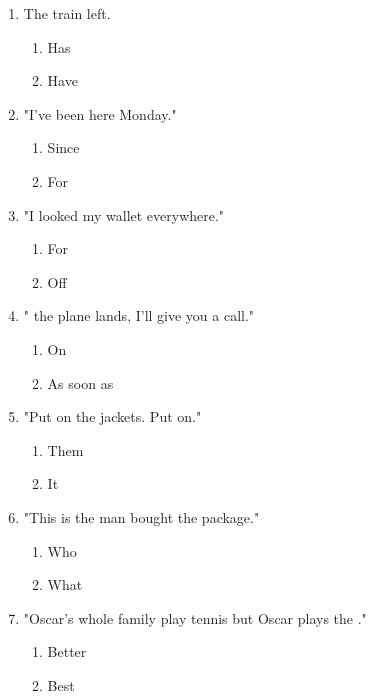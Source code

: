 \documentclass[11pt,a4paper]{article}
\begin{document}
\begin{enumerate}
    \item The train \underline{\hspace{2cm}} left.
    \begin{enumerate}[label=\alph*.] \item Has \item Have \end{enumerate}

    \item "I've been here \underline{\hspace{2cm}} Monday."
    \begin{enumerate}[label=\alph*.] \item Since \item For \end{enumerate}

    \item "I looked \underline{\hspace{2cm}} my wallet everywhere."
    \begin{enumerate}[label=\alph*.] \item For \item Off \end{enumerate}

    \item "\underline{\hspace{2cm}} the plane lands, I'll give you a call."
    \begin{enumerate}[label=\alph*.] \item On \item As soon as \end{enumerate}

    \item "Put on the jackets. Put \underline{\hspace{2cm}} on."
    \begin{enumerate}[label=\alph*.] \item Them \item It \end{enumerate}

    \item "This is the man \underline{\hspace{2cm}} bought the package."
    \begin{enumerate}[label=\alph*.] \item Who \item What \end{enumerate}

    \item "Oscar's whole family play tennis but Oscar plays the \underline{\hspace{2cm}}."
    \begin{enumerate}[label=\alph*.] \item Better \item Best \end{enumerate}


\end{enumerate}
\end{document}
